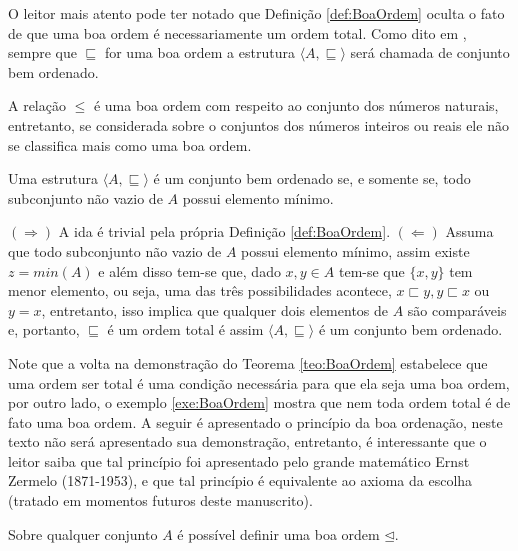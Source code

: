 O leitor mais atento pode ter notado que Definição \ref{def:BoaOrdem} oculta o fato de que uma boa ordem é necessariamente um ordem total. Como dito em \cite{joaoPavao2014}, sempre que $\sqsubseteq$ for uma boa ordem a estrutura $\langle A, \sqsubseteq \rangle$ será chamada de conjunto bem ordenado.

\begin{exemplo}\label{exe:BoaOrdem}
	A relação $\leq$ é uma boa ordem com respeito ao conjunto dos números naturais, entretanto, se considerada sobre o conjuntos dos números inteiros ou reais ele não se classifica mais como uma boa ordem. 
\end{exemplo}

\begin{teorema}\label{teo:BoaOrdem}
	Uma estrutura $\langle A, \sqsubseteq \rangle$  é um conjunto bem ordenado se, e somente se, todo subconjunto não vazio de $A$ possui elemento mínimo.
\end{teorema}

\begin{prova}
	$(\Rightarrow)$ A ida é trivial pela própria Definição \ref{def:BoaOrdem}. $(\Leftarrow)$ Assuma que todo subconjunto não vazio de $A$ possui elemento mínimo, assim existe $z = min(A)$ e além disso tem-se que, dado $x, y \in A$ tem-se que $\{x, y\}$ tem menor elemento, ou seja, uma das três possibilidades acontece, $x \sqsubset y, y \sqsubset x$ ou $y = x$, entretanto, isso implica que qualquer dois elementos de $A$ são comparáveis e, portanto, $\sqsubseteq$ é um ordem total é assim $\langle A, \sqsubseteq \rangle$ é um conjunto bem ordenado.
\end{prova}

Note que a volta na demonstração do Teorema \ref{teo:BoaOrdem} estabelece que uma ordem ser total é uma condição necessária para que ela seja uma boa ordem, por outro lado, o exemplo \ref{exe:BoaOrdem} mostra que nem toda ordem total é de fato uma boa ordem. A seguir é apresentado o princípio da boa ordenação, neste texto não será apresentado sua demonstração, entretanto, é interessante que o leitor saiba que tal princípio foi apresentado pelo grande matemático Ernst Zermelo (1871-1953), e que tal princípio é equivalente ao axioma da escolha \cite{carmo2013} (tratado em momentos futuros deste manuscrito).

\begin{principio}\label{pri:BoaOrdenacao}
	Sobre qualquer conjunto $A$ é possível definir uma boa ordem $\unlhd$. 
\end{principio}

